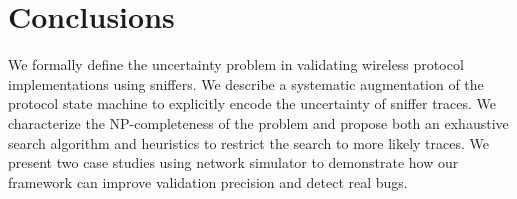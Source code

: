 \section{Conclusions}
\label{sec:conclusion}

We formally define the uncertainty problem in validating
wireless protocol implementations using sniffers. We describe a systematic augmentation of the
protocol state machine to explicitly encode the uncertainty of sniffer traces.
We characterize the NP-completeness of the problem and propose both an exhaustive
search algorithm and heuristics to restrict the search to more likely 
traces. We present two case studies using \ns{} network simulator to demonstrate
how our framework can improve validation precision and detect real bugs.

\begin{comment}
Finally, we discuss a few challenges and future
directions.

\textbf{Verification Coverage.} Given a single sniffer trace, it is possible
that not all the states in the state machine are visited during the verification
process. For instance, a rate control state machine based on certain consecutive
packet losses patterns can not be verified if no such consecutive losses appear
in the sniffer trace. In general, given a protocol state machine, how to extract
the packet patterns for each state to be reached and how to alter the testing
such that such patterns can be observed?

\textbf{State Machine Generation.} We manually translated the protocols studied
in this paper into monitor state machines based on the source code, comments and
documentation. The process is time-consuming and error-prone. A more scalable
approach would be taking the protocol specification written in certain formal
language, and automatically translate such specification into state machines
that can be used for verification process.

\end{comment}

